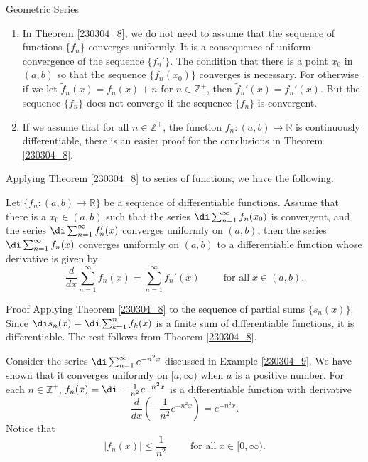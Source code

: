 \begin{example}[label=230305_16]{Geometric Series}
\begin{example}[label=230304_9]{}
\begin{remark}{}
 \begin{enumerate}[1.]
 \item 
 In   Theorem \ref{230304_8}, we do not need to assume that the sequence of functions $\{f_n\}$ converges uniformly. It is a consequence of uniform convergence of the sequence $\{f_n'\}$. The condition that there is a point $x_0$ in $(a,b)$ so that  the sequence   $\{f_n(x_0)\}$ converges is  necessary. For otherwise  if we let $\widetilde{f}_n(x)=f_n(x)+n$ for  $n\in\mathbb{Z}^+$, then $\widetilde{f}_n'(x)=f_n'(x) $. But the sequence $\{\widetilde{f}_n\}$ does not converge if the sequence $\{f_n\}$  is convergent.
 \item
If we assume that  for all $n\in\mathbb{Z}^+$, the function  $f_n:(a,b)\to\mathbb{R}$ is continuously differentiable, there is an easier proof for the conclusions in Theorem \ref{230304_8}. \end{enumerate}
\end{remark}

Applying Theorem \ref{230304_8} to series of functions, we have the following.
\begin{corollary}[label=230304_14]
{}Let $\{f_n:(a,b)\to\mathbb{R}\}$ be a sequence of differentiable functions. Assume that there is a  $x_0\in (a, b)$ such that the series $\di\sum_{n=1}^{\infty}f_n(x_0)$ is convergent, and the series $\di\sum_{n=1}^{\infty}f_n'(x)$ converges uniformly on $(a,b)$, then the series  $\di\sum_{n=1}^{\infty}f_n(x)$ converges uniformly on $(a,b)$ to a differentiable function whose derivative is given by
\[\frac{d}{dx}\sum_{n=1}^{\infty}f_n(x)=\sum_{n=1}^{\infty}f_n'(x)\hspace{1cm}\text{for all}\;x\in (a,b).\]
\end{corollary}
\begin{myproof}{Proof}
Applying Theorem \ref{230304_8} to the sequence of partial sums $\{s_n(x)\}$. Since $\di s_n(x)=\di\sum_{k=1}^nf_k(x)$ is a finite sum of differentiable functions, it is differentiable. The rest follows from Theorem \ref{230304_8}.
\end{myproof}

\begin{example}{}
Consider the series $\di\sum_{n=1}^{\infty} e^{-n^2x}$ discussed in Example \ref{230304_9}. We have shown that it converges uniformly on $[a,\infty)$ when $a$ is a positive number.  For each $n\in\mathbb{Z}^+$, $f_n(x)=\di-\frac{1}{n^2}e^{-n^2 x}$ is a differentiable function with derivative 
\[\frac{d}{dx}\left(-\frac{1}{n^2}e^{-n^2 x}\right)=e^{-n^2 x}.\]
Notice that  
\[|f_n(x)|\leq \frac{1}{n^2}\hspace{1cm}\text{for all}\;x\in [0,\infty).\]
 

\end{example}
\end{example}
\end{example}
